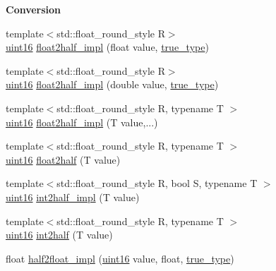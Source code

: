 \begin{Indent}\textbf{ Conversion}\par
\begin{DoxyCompactItemize}
\item 
{\footnotesize template$<$std\+::float\+\_\+round\+\_\+style R$>$ }\\\hyperlink{namespacehalf__float_1_1detail_a239ec58092b4e4849b444baee1a01088}{uint16} \hyperlink{namespacehalf__float_1_1detail_a32be02e128131df654adb21672ad1e8d}{float2half\+\_\+impl} (float value, \hyperlink{namespacehalf__float_1_1detail_a5e245748a3cc20e348dd92383d99d03c}{true\+\_\+type})
\item 
{\footnotesize template$<$std\+::float\+\_\+round\+\_\+style R$>$ }\\\hyperlink{namespacehalf__float_1_1detail_a239ec58092b4e4849b444baee1a01088}{uint16} \hyperlink{namespacehalf__float_1_1detail_a36dca5081e9a14c8e523d2415e476ace}{float2half\+\_\+impl} (double value, \hyperlink{namespacehalf__float_1_1detail_a5e245748a3cc20e348dd92383d99d03c}{true\+\_\+type})
\item 
{\footnotesize template$<$std\+::float\+\_\+round\+\_\+style R, typename T $>$ }\\\hyperlink{namespacehalf__float_1_1detail_a239ec58092b4e4849b444baee1a01088}{uint16} \hyperlink{namespacehalf__float_1_1detail_a7a40ca55db89afccd351332db5535ed1}{float2half\+\_\+impl} (T value,...)
\item 
{\footnotesize template$<$std\+::float\+\_\+round\+\_\+style R, typename T $>$ }\\\hyperlink{namespacehalf__float_1_1detail_a239ec58092b4e4849b444baee1a01088}{uint16} \hyperlink{namespacehalf__float_1_1detail_a323f122774a4f85d4ce4c4d91a8d066b}{float2half} (T value)
\item 
{\footnotesize template$<$std\+::float\+\_\+round\+\_\+style R, bool S, typename T $>$ }\\\hyperlink{namespacehalf__float_1_1detail_a239ec58092b4e4849b444baee1a01088}{uint16} \hyperlink{namespacehalf__float_1_1detail_a80ed90b3d769041decdd5eb79e6f3017}{int2half\+\_\+impl} (T value)
\item 
{\footnotesize template$<$std\+::float\+\_\+round\+\_\+style R, typename T $>$ }\\\hyperlink{namespacehalf__float_1_1detail_a239ec58092b4e4849b444baee1a01088}{uint16} \hyperlink{namespacehalf__float_1_1detail_a739b4225bfb0a1a45dff1c76432a90c1}{int2half} (T value)
\item 
float \hyperlink{namespacehalf__float_1_1detail_a1f78a7e278b390a587dea90e02686e28}{half2float\+\_\+impl} (\hyperlink{namespacehalf__float_1_1detail_a239ec58092b4e4849b444baee1a01088}{uint16} value, float, \hyperlink{namespacehalf__float_1_1detail_a5e245748a3cc20e348dd92383d99d03c}{true\+\_\+type})

\end{DoxyCompactItemize}
\end{Indent}
